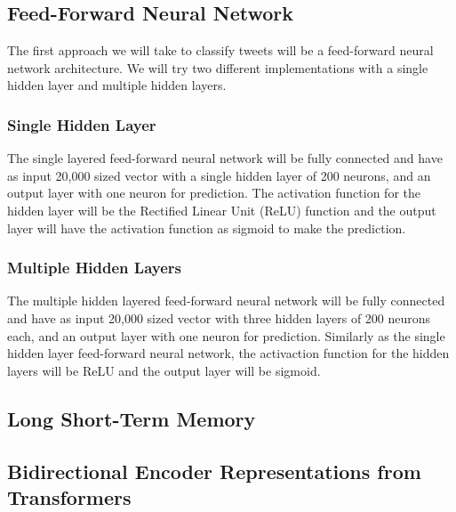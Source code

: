 \subsection{Feed-Forward Neural Network} The first approach we will
take to classify tweets will be a feed-forward neural network
architecture. We will try two different implementations with a single
hidden layer and multiple hidden layers.

\subsubsection{Single Hidden Layer} The single layered feed-forward
neural network will be fully connected and have as input 20,000 sized
vector with a single hidden layer of 200 neurons, and an output
layer with one neuron for prediction. The activation function for the
hidden layer will be the Rectified Linear Unit (ReLU) function and the
output layer will have the activation function as sigmoid to make the
prediction.

\subsubsection{Multiple Hidden Layers} The multiple hidden layered
feed-forward neural network will be fully connected and have as input
20,000 sized vector with three hidden layers of 200 neurons each, and
an output layer with one neuron for prediction. Similarly as the
single hidden layer feed-forward neural network, the activaction
function for the hidden layers will be ReLU and the output layer will
be sigmoid.

\subsection{Long Short-Term Memory}

\subsection{Bidirectional Encoder Representations from Transformers}
